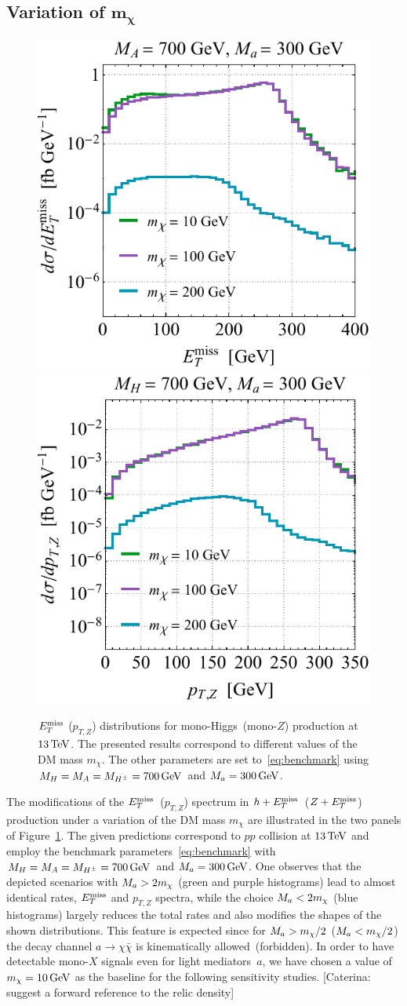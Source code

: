 \subsection*{Variation of $\bm{m_\chi}$}

\begin{figure}[t!]
\centering
\includegraphics[height=0.45\textwidth]{texinputs/04_grid/newfigures/mdml.pdf} \qquad 
\includegraphics[height=0.45\textwidth]{texinputs/04_grid/newfigures/mdmr.pdf}
\vspace{2mm}
\caption{\label{fig:mdmvar} $E_T^\mathrm{miss}$ ($p_{T,Z}$) distributions for mono-Higgs~(mono-$Z$) production at $13 \, {\rm TeV}$. The presented results correspond to different values of the DM mass $m_\chi$. The other \hdma parameters are set to~\eqref{eq:benchmark} using $M_{H} = M_{A} = M_{H^{\pm}} = 700 \, {\rm GeV}$ and $M_{a} = 300 \, {\rm GeV}$. }
\end{figure}

The modifications of the $E_T^\mathrm{miss}$~($p_{T,Z}$) spectrum in $h+E_T^\mathrm{miss}$~($Z+E_T^\mathrm{miss}$) production under a variation of the DM mass $m_\chi$ are illustrated in the two panels of Figure~\ref{fig:mdmvar}. The given predictions correspond to $pp$ collision at $13 \, {\rm TeV}$ and employ the benchmark parameters~\eqref{eq:benchmark} with $M_{H} = M_{A} = M_{H^{\pm}} = 700 \, {\rm GeV}$ and $M_{a} = 300 \, {\rm GeV}$. One observes that the depicted scenarios with $M_{a}  > 2 m_\chi$ (green and purple histograms) lead to almost identical rates, $E_T^\mathrm{miss}$ and $p_{T,Z}$ spectra, while the choice $M_{a}  < 2 m_\chi$ (blue histograms) 
largely reduces the total rates and also modifies the shapes of the shown distributions. This feature is expected since for $M_{a} > m_\chi/2$ ($M_{a} < m_\chi/2$) the decay channel $a \to \chi \bar \chi$ is kinematically allowed~(forbidden). In order to have detectable mono-$X$ signals even for light mediators~$a$, we have chosen a value of  $m_\chi = 10 \, {\rm GeV}$ as the baseline for the following sensitivity studies. {\color{red} [Caterina: suggest a forward reference to the relic density]}

